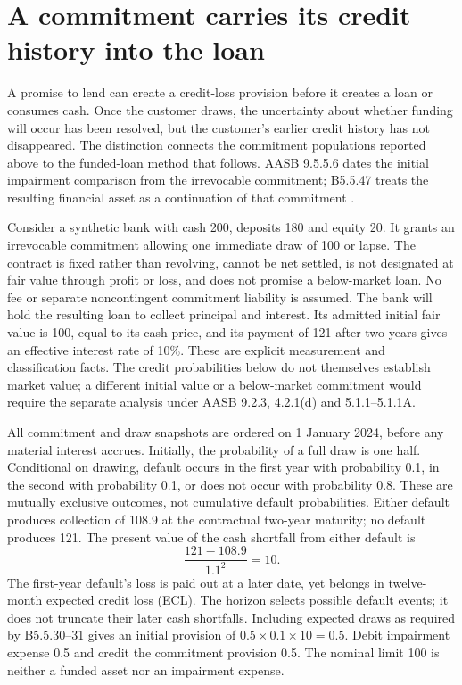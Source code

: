 \section{A commitment carries its credit history into the loan}
\label{sec:bank-commitment-draw}

A promise to lend can create a credit-loss provision before it creates a
loan or consumes cash. Once the customer draws, the uncertainty about whether
funding will occur has been resolved, but the customer's earlier credit history
has not disappeared. The distinction connects the commitment populations
reported above to the funded-loan method that follows. AASB 9.5.5.6 dates the
initial impairment comparison from the irrevocable commitment; B5.5.47 treats
the resulting financial asset as a continuation of that commitment
\citep{aasb9dated}.

Consider a synthetic bank with cash 200, deposits 180 and equity 20. It grants
an irrevocable commitment allowing one immediate draw of 100 or lapse. The
contract is fixed rather than revolving, cannot be net settled, is not
designated at fair value through profit or loss, and does not promise a
below-market loan. No fee or separate noncontingent commitment liability is
assumed. The bank will hold the resulting loan to collect principal and
interest. Its admitted initial fair value is 100, equal to its cash price,
and its payment of 121 after two years gives an effective interest rate of
10\%. These are explicit measurement and classification facts. The credit
probabilities below do not themselves establish market value; a different
initial value or a below-market commitment would require the separate
analysis under AASB 9.2.3, 4.2.1(d) and 5.1.1--5.1.1A.

All commitment and draw snapshots are ordered on 1 January 2024, before any
material interest accrues. Initially, the probability of a full draw is one
half. Conditional on drawing, default occurs in the first year with probability
0.1, in the second with probability 0.1, or does not occur with probability
0.8. These are mutually exclusive outcomes, not cumulative default
probabilities. Either default produces collection of 108.9 at the contractual
two-year maturity; no default produces 121. The present value of the cash
shortfall from either default is
\[
  \frac{121-108.9}{1.1^2}=10.
\]
The first-year default's loss is paid out at a later date, yet belongs in
twelve-month expected credit loss (ECL). The horizon selects possible default
events; it does not truncate their later cash shortfalls. Including expected
draws as required by B5.5.30--31 gives an initial provision of
\(0.5\times0.1\times10=0.5\). Debit impairment expense 0.5 and credit
the commitment provision 0.5. The nominal limit 100 is neither a funded asset
nor an impairment expense.

